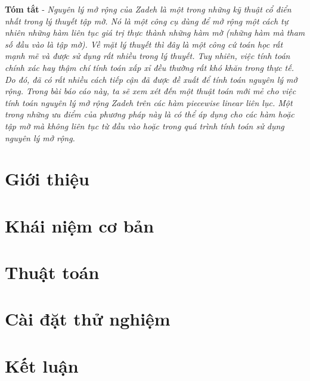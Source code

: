 \documentclass[12pt]{report}
\begin{document}


\tableofcontents 
\newpage

\newpage
\setcounter{page}{1}

{\small \textbf{Tóm tắt} - \textit{
Nguyên lý mở rộng của Zadeh là một trong những 
kỹ thuật cổ điển nhất trong lý thuyết tập mờ. Nó là một công cụ 
dùng để mở rộng một cách tự nhiên những hàm liên tục giá trị 
thực thành những hàm mờ (những hàm mà tham số đầu vào là tập mờ). 
Về mặt lý thuyết thì đây là một công cứ toán học rất mạnh mẽ và
được sử dụng rất nhiều trong lý thuyết. Tuy nhiên, việc tính toán 
chính xác hay thậm chí tính toán xấp xỉ đều thường rất khó 
khăn trong thực tế. Do đó, đã có rất nhiều cách tiếp cận 
đã được đề xuất để tính toán nguyên lý mở rộng. 
Trong bài báo cáo này, ta sẽ xem xét đến một thuật toán 
mới mẻ cho việc tính toán nguyên lý mở rộng Zadeh 
trên các hàm piecewise linear liên lục. Một trong những 
ưu điểm của phương pháp này là có thể áp dụng cho các hàm 
hoặc tập mờ mà không liên tục từ đầu vào hoặc trong quá trình tính toán 
sử dụng nguyên lý mở rộng. 
}
}

\section{Giới thiệu}


\section{Khái niệm cơ bản}


\section{Thuật toán}


\section{Cài đặt thử nghiệm}


\section{Kết luận}


{}

\end{document}
